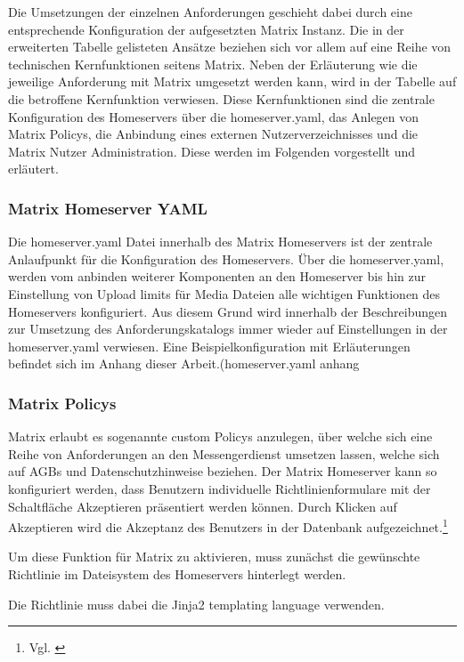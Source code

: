 Die Umsetzungen der einzelnen Anforderungen geschieht dabei durch eine entsprechende Konfiguration der aufgesetzten Matrix Instanz. Die in der erweiterten Tabelle gelisteten Ansätze beziehen sich vor allem auf eine Reihe von technischen Kernfunktionen seitens Matrix. Neben der Erläuterung wie die jeweilige Anforderung mit Matrix umgesetzt werden kann, wird in der Tabelle auf die betroffene Kernfunktion verwiesen. Diese Kernfunktionen sind die zentrale Konfiguration des Homeservers über die homeserver.yaml, das Anlegen von Matrix Policys,
die Anbindung eines externen Nutzerverzeichnisses und die Matrix Nutzer Administration. Diese werden im Folgenden vorgestellt und erläutert.

\subsubsection{Matrix Homeserver YAML}\label{chapter:vdmf}
Die homeserver.yaml Datei innerhalb des Matrix Homeservers ist der zentrale Anlaufpunkt für die Konfiguration des Homeservers.
Über die homeserver.yaml, werden vom anbinden weiterer Komponenten an den Homeserver bis hin zur Einstellung von Upload limits für Media Dateien alle wichtigen Funktionen des Homeservers konfiguriert. Aus diesem Grund wird innerhalb der Beschreibungen zur Umsetzung des Anforderungskatalogs immer wieder auf Einstellungen in der homeserver.yaml verwiesen. Eine Beispielkonfiguration mit Erläuterungen befindet sich im Anhang dieser Arbeit.(homeserver.yaml anhang

\subsubsection{Matrix Policys}\label{chapter:vdmf}
Matrix erlaubt es sogenannte custom Policys anzulegen, über welche sich eine Reihe von Anforderungen an den Messengerdienst umsetzen lassen, welche sich auf AGBs und Datenschutzhinweise beziehen.
Der Matrix Homeserver kann so konfiguriert werden, dass Benutzern individuelle Richtlinienformulare mit der Schaltfläche \glqq Akzeptieren\grqq{} präsentiert werden können. Durch Klicken auf \glqq Akzeptieren\grqq{} wird die Akzeptanz des Benutzers in der Datenbank aufgezeichnet.\footnote{Vgl. \cite{Matrix.org-custom-policies2020}}

Um diese Funktion für Matrix zu aktivieren, muss zunächst die gewünschte Richtlinie im Dateisystem des Homeservers hinterlegt werden.

Die Richtlinie muss dabei die Jinja2 templating language verwenden.

